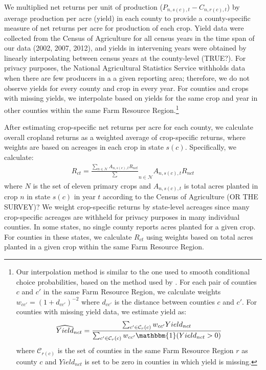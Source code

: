 \documentclass[11pt]{article}
\begin{document}
We multiplied net returns per unit of production ($P_{n,s(c),t} - C_{n,r(c),t}$) by average production per acre (yield) in each county to provide a county-specific measure of net returns per acre for production of each crop. Yield data were collected from the Census of Agriculture for all census years in the time span of our data (2002, 2007, 2012), and yields in intervening years were obtained by linearly interpolating between census years at the county-level (TRUE?). For privacy purposes, the National Agricultural Statistics Service withholds data when there are few producers in a a given reporting area; therefore, we do not observe yields for every county and crop in every year. For counties and crops with missing yields, we interpolate based on yields for the same crop and year in other counties within the same Farm Resource Region.\footnote{Our interpolation method is similar to the one used to smooth conditional choice probabilities, based on the method used by \citet{scott2014}. For each pair of counties $c$ and $c'$ in the same Farm Resource Region, we calculate weights $w_{cc'} = (1+d_{cc'})^{-2}$ where $d_{cc'}$ is the distance between counties $c$ and $c'$. For counties with missing yield data, we estimate yield as:
\begin{align}
\widehat{Yield}_{nct} = \frac{\sum_{c' \in \mathcal{C}_r(c)} w_{cc'} Yield_{nct}}{\sum_{c' \in \mathcal{C}_r(c)} w_{cc'} \mathbbm{1}(Yield_{nct} > 0)}
\end{align}
where $\mathcal{C}_{r(c)}$ is the set of counties in the same Farm Resource Region $r$ as county $c$ and $Yield_{nct}$ is set to be zero in counties in which yield is missing.}

After estimating crop-specific net returns per acre for each county, we calculate overall cropland returns as a weighted average of crop-specific returns, where weights are based on acreages in each crop in state $s(c)$. Specifically, we calculate:
\begin{align}
R_{ct} = \frac{\sum_{n \in \mathcal{N}} A_{n,s(c),t} R_{nct}}\sum_{n \in \mathcal{N}} A_{n,s(c),t} R_{nct}
\end{align}
where $N$ is the set of eleven primary crops and $A_{n,s(c),t}$ is total acres planted in crop $n$ in state $s(c)$ in year $t$ according to the Census of Agriculture (OR THE SURVEY)? We weight crop-specific returns by state-level acreages since many crop-specific acreages are withheld for privacy purposes in many individual counties. In some states, no single county reports acres planted for a given crop. For counties in these states, we calculate $R_{ct}$ using weights based on total acres planted in a given crop within the same Farm Resource Region. 
\end{document}
